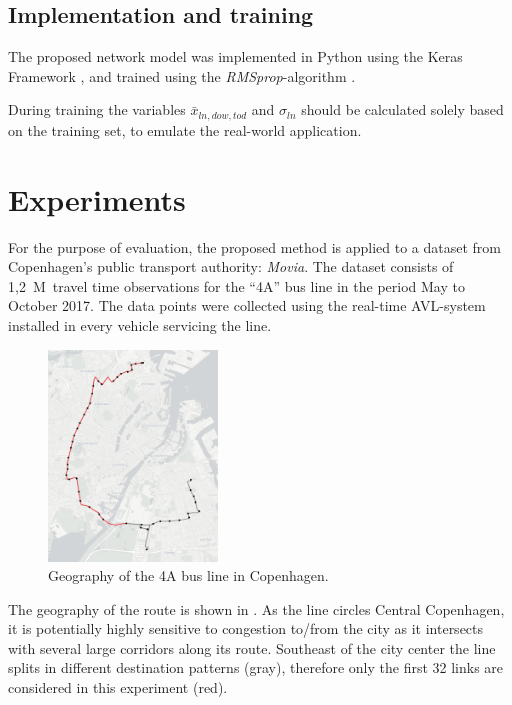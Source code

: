 ﻿\documentclass[preprint,11pt,5p,twocolumn]{elsarticle}
\begin{document}
\subsection{Implementation and training}
The proposed network model was implemented in Python using the Keras Framework \cite{Keras}, and trained using the \emph{RMSprop}-algorithm \cite{RMSprop}.

During training the variables $\mathit{\bar{x}_{\mathit{ln},\mathit{dow},\mathit{tod}}}$ and $\sigma_\mathit{ln}$ should be calculated solely based on the training set, to emulate the real-world application.

\section{Experiments}
\label{sec:experiments}

For the purpose of evaluation, the proposed method is applied to a dataset from Copenhagen's public transport authority: \emph{Movia}. The dataset consists of 1,2~M~travel time observations for the ``4A'' bus line in the period May to October 2017. The data points were collected using the real-time AVL-system installed in every vehicle servicing the line. 

\begin{figure}[!ht]
  \centering
  \includegraphics[width=0.4\textwidth]{drawings/map.png}
  \caption{Geography of the 4A bus line in Copenhagen.}
  \label{fig:4a_map}
\end{figure}

The geography of the route is shown in . As the line circles Central Copenhagen, it is potentially highly sensitive to congestion to/from the city as it intersects with several large corridors along its route. Southeast of the city center the line splits in different destination patterns (gray), therefore only the first 32 links are considered in this experiment (red).
\end{document}
